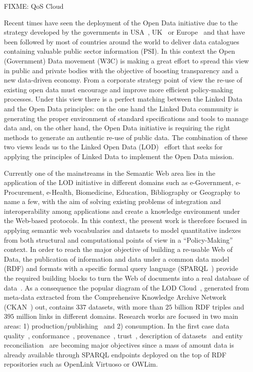 FIXME: QoS Cloud

Recent times have seen the deployment of the Open Data initiative due to the strategy 
developed by the governments in USA~\cite{usa}, UK~\cite{uk2012} or Europe~\cite{d2003-update,policy-eu} and that have been followed by most of countries around the world to deliver data 
catalogues containing valuable public sector information (PSI). In this context the Open (Government) Data movement (W3C) is making a great effort 
to spread this view in public and private bodies with the objective of boosting transparency and a new data-driven economy. 
From a corporate strategy point of view the re-use of existing open data must encourage and improve 
more efficient policy-making processes. Under this view there is a perfect matching between the Linked Data and the Open Data 
principles: on the one hand the Linked Data community is generating the proper environment of standard 
specifications and tools to manage data and, on the other hand, the Open Data initiative is requiring 
the right methods to generate an authentic re-use of public data. The combination of these 
two views leads us to the Linked Open Data (LOD)~\cite{Berners-Lee-2006,Heath_Bizer_2011,Bauer2012} effort that seeks for applying the principles of 
Linked Data to implement the Open Data mission.

Currently one of the mainstreams in the Semantic Web area lies in the application of the LOD initiative in 
different domains such as  e-Government, e-Procurement, e-Health, Biomedicine, Education, Bibliography or Geography to name a few,  
with the aim of solving existing problems of integration and interoperability among applications and create a 
knowledge environment under the Web-based protocols. In this context, the present work is therefore focused 
in applying semantic web vocabularies and datasets to model quantitative indexes from both structural 
and computational points of view in a ``Policy-Making'' context. In order to reach the major objective of building a re-usable Web of Data,  
the publication of information and data under a common data model (RDF) and formats with 
a specific formal query language (SPARQL~\cite{Sparql11}) provide the required building blocks to turn 
the Web of documents into a real database of data~\cite{freebase}. As a consequence the popular 
diagram of the LOD Cloud~\cite{linked-data-cloud}, generated from meta-data extracted from the Comprehensive Knowledge Archive Network (CKAN~\cite{ckan}) out, 
contains $337$ datasets, with more than $25$ billion RDF triples and $395$ million links in different  domains. 
Research works are focused in two main areas: 1) production/publishing~\cite{bizer07how} and 2) consumption. 
In the first case data quality~\cite{wiqa,ld-quality,lodq}, conformance~\cite{HoganUHCPD:2012:237}, 
provenance~\cite{w3c-prov}, trust~\cite{Carroll05namedgraphs}, description of datasets~\cite{void} and 
entity reconciliation~\cite{Maali_Cyganiak_2011} are becoming major objectives since a mass of amount data is already available 
through SPARQL endpoints deployed on the top of RDF repositories such as OpenLink Virtuoso or OWLim. 


